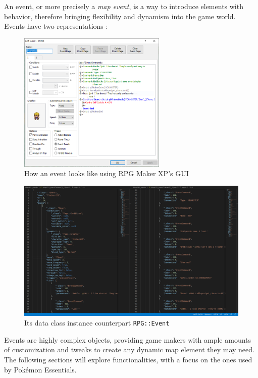 \documentclass[11pt]{article}
\begin{document}
{An event, or more precisely a \textit{map event}, is a way to introduce elements with behavior, therefore bringing flexibility and dynamism into the game world. Events have two representations :

\begin{figure}[!h]
	\centering
	\includegraphics[width=0.63\textwidth]{Event} 
	\caption{How an event looks like using RPG Maker XP's GUI }
	
\end{figure}

\newpage
\begin{figure}[!h]
	\centering
	\includegraphics[width=\textwidth]{Event_json}
	\caption{Its data class instance counterpart \texttt{RPG::Event}}
	
\end{figure}


Events are highly complex objects, providing game makers with ample amounts of customization and tweaks to create any dynamic map element they may need. The following sections will explore functionalities, with a focus on the ones used by Pokémon Essentials.




}
\end{document}
